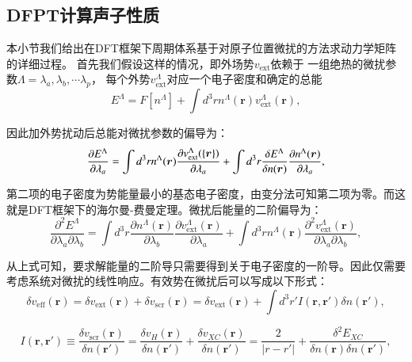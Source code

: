 \subsection{DFPT计算声子性质}
本小节我们给出在DFT框架下周期体系基于对原子位置微扰的方法求动力学矩阵的详细过程。
首先我们假设这样的情况，即外场势$v_{\mathrm{ext}}$依赖于
一组绝热的微扰参数$\Lambda={\lambda_a,\lambda_b, \cdots \lambda_p}$，
每个外势$v_{\mathrm{ext}}^\Lambda$对应一个电子密度和确定的总能
\begin{equation}
  E^\Lambda = F[n^\Lambda]+\int d^3 r n^\Lambda (\bm{r})v_\mathrm{ext}^\Lambda (\bm{r}) ,
\end{equation}

因此加外势扰动后总能对微扰参数的偏导为：
\begin{equation}
  \frac{\partial E^\Lambda}{\partial \lambda_a} =
  \int d^3 r n^\Lambda(\bm{r})\frac{\partial v^\Lambda_\mathrm{ext}(\{\bm{r}\})}{\partial \lambda_a} +
  \int d^3 r \frac{\delta E^\Lambda}{\delta n(\bm{r})} \frac{\partial n^\Lambda(\bm{r})}{\partial \lambda_a} ,
\end{equation}

第二项的电子密度为势能量最小的基态电子密度，由变分法可知第二项为零。而这就是DFT框架下的海尔曼-费曼定理\cite{feynman1939forces}。微扰后能量的二阶偏导为：
\begin{equation}\label{eq:second_order_energy}
  \frac{\partial^2 E^\Lambda}{\partial\lambda_a\partial\lambda_b} =
  \int d^3 r\frac{\partial n^\Lambda(\bm{r})}{\partial\lambda_b}\frac{\partial v^\Lambda_\mathrm{ext}(\bm{r})}{\partial\lambda_a} +
  \int d^3 r n^\Lambda(\bm{r})\frac{\partial^2 v^\Lambda_\mathrm{ext}(\bm{r})}{\partial\lambda_a\partial\lambda_b} ,
\end{equation}

从上式可知，要求解能量的二阶导只需要得到关于电子密度的一阶导。因此仅需要考虑系统对微扰的线性响应。有效势在微扰后可以写成以下形式：
\begin{equation}\label{eq:linear_variation}
  \delta v_{\mathrm{eff}}(\bm{r}) = \delta v_\mathrm{ext}(\bm{r}) + \delta v_\mathrm{scr}(\bm{r}) =
  \delta v_\mathrm{ext}(\bm{r}) + \int d^3 r' I(\bm{r},\bm{r'})\delta n(\bm{r'}) ,
\end{equation}

\begin{equation}
  I(\bm{r},\bm{r'}) \equiv \frac{\delta v_\mathrm{scr}(\bm{r})}{\delta n(\bm{r'})} = \frac{\delta v_H(\bm{r})}{\delta n(\bm{r'})} +
  \frac{\delta v_{XC}(\bm{r})}{\delta n(\bm{r'})} =
  \frac{2}{|r-r'|} + \frac{\delta^2 E_{XC}}{\delta n(\bm{r}) \delta n(\bm{r'})} ,
\end{equation}

